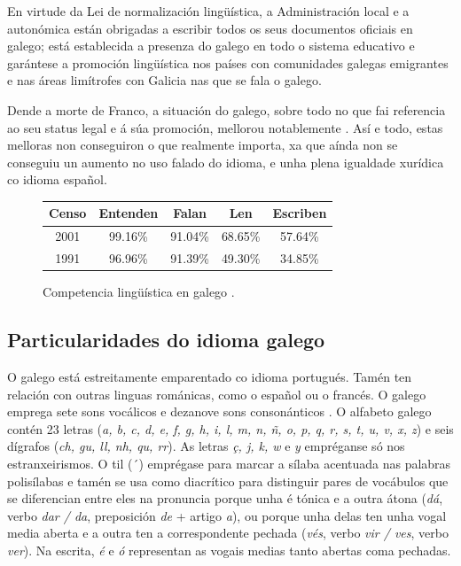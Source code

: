 \begin{multicols}{2}
En virtude da Lei de normalización lingüística, a Administración local e a autonómica están obrigadas a escribir todos os seus documentos oficiais en galego; está establecida a presenza do galego en todo o sistema educativo e garántese a promoción lingüística nos países con comunidades galegas emigrantes e nas áreas limítrofes con Galicia nas que se fala o galego. 

Dende a morte de Franco, a situación do galego, sobre todo no que fai referencia ao seu status legal e á súa promoción, mellorou notablemente \cite{GAL-Nota7}. Así e todo, estas melloras non conseguiron o que realmente importa, xa que aínda non se conseguiu un aumento no uso falado do idioma, e unha plena igualdade xurídica co idioma español.

\begin{figure}[htb]
\center
\begin{tabular}{|c|c|c|c|c|}
\hline  Censo & Entenden & Falan & Len & Escriben\\ 
\hline  2001 & 99.16\% & 91.04\%& 68.65\%& 57.64\%\\ 
\hline  1991 & 96.96\% & 91.39\%& 49.30\%& 34.85\%\\ 
\hline 
\end{tabular} 
\caption{Competencia lingüística en galego \cite{GAL-Nota8}.}
\end{figure}

\subsection{Particularidades do idioma galego}

   O galego está estreitamente emparentado co idioma portugués. Tamén ten relación con outras linguas románicas, como o español ou o francés. O galego emprega sete sons vocálicos e dezanove sons consonánticos \cite{GAL-Nota9}. O alfabeto galego contén 23 letras (\textit{a, b, c, d, e, f, g, h, i, l, m, n, ñ, o, p, q, r, s, t, u, v, x, z}) e seis dígrafos (\textit{ch, gu, ll, nh, qu, rr}). As letras \textit{ç, j, k, w} e \textit{y} empréganse só nos estranxeirismos. O til (´) emprégase para marcar a sílaba acentuada nas palabras polisílabas e tamén se usa como diacrítico para distinguir pares de vocábulos que se diferencian entre eles na pronuncia porque unha é tónica e a outra átona (\textit{dá}, verbo \textit{dar / da}, preposición \textit{de} + artigo \textit{a}), ou porque unha delas ten unha vogal media aberta e a outra ten a correspondente pechada (\textit{vés}, verbo \textit{vir / ves}, verbo \textit{ver}). Na escrita, \textit{é} e \textit{ó} representan as vogais medias tanto abertas coma pechadas.



\end{multicols}
